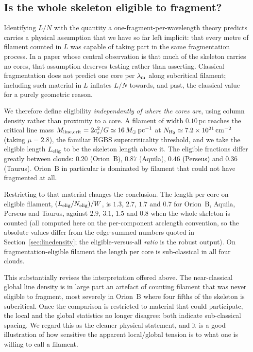 \documentclass[usenatbib,twoside,twocolumn]{mnras}
\begin{document}
\subsection{Is the whole skeleton eligible to fragment?}
\label{sec:eligible}
Identifying $L/N$ with the quantity a one-fragment-per-wavelength theory predicts carries a physical assumption that we have so far left implicit: that every metre of filament counted in $L$ was capable of taking part in the same fragmentation process. In a paper whose central observation is that much of the skeleton carries no cores, that assumption deserves testing rather than asserting. Classical fragmentation does not predict one core per $\lambda_{\rm m}$ along subcritical filament; including such material in $L$ inflates $L/N$ towards, and past, the classical value for a purely geometric reason.

We therefore define eligibility \emph{independently of where the cores are}, using column density rather than proximity to a core. A filament of width $0.10$\,pc reaches the critical line mass $M_{\rm line,crit}=2c_s^2/G\simeq16\,M_\odot\,{\rm pc^{-1}}$ at $N_{\rm H_2}\simeq7.2\times10^{21}\,{\rm cm^{-2}}$ (taking $\mu=2.8$), the familiar HGBS supercriticality threshold, and we take the eligible length $L_{\rm elig}$ to be the skeleton length above it. The eligible fractions differ greatly between clouds: $0.20$ (Orion~B), $0.87$ (Aquila), $0.46$ (Perseus) and $0.36$ (Taurus). Orion~B in particular is dominated by filament that could not have fragmented at all.

Restricting to that material changes the conclusion. The length per core on eligible filament, $(L_{\rm elig}/N_{\rm elig})/W$, is $1.3$, $2.7$, $1.7$ and $0.7$ for Orion~B, Aquila, Perseus and Taurus, against $2.9$, $3.1$, $1.5$ and $0.8$ when the whole skeleton is counted (all computed here on the per-component arclength convention, so the absolute values differ from the edge-summed numbers quoted in Section~\ref{sec:linedensity}; the eligible-versus-all \emph{ratio} is the robust output). On fragmentation-eligible filament the length per core is sub-classical in all four clouds.

This substantially revises the interpretation offered above. The near-classical global line density is in large part an artefact of counting filament that was never eligible to fragment, most severely in Orion~B where four fifths of the skeleton is subcritical. Once the comparison is restricted to material that could participate, the local and the global statistics no longer disagree: both indicate sub-classical spacing. We regard this as the cleaner physical statement, and it is a good illustration of how sensitive the apparent local/global tension is to what one is willing to call a filament.
\end{document}
